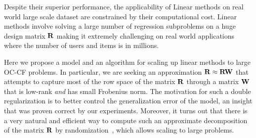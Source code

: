

Despite their superior performance, the applicability of Linear methods on real world large scale dataset are constrained by their computational cost. Linear methods involve solving  a large number of regression subproblems on a huge design matrix $\mathbf{R}$ making it extremely challenging on real world applications where the number of users and items is in millions.

Here we propose a model and an algorithm for scaling up linear methods to large OC-CF problems. 
In particular, we are seeking an approximation $\mathbf{R} \approx \mathbf{R} \mathbf{W}$ that attempts to capture most of the row space of the matrix $\mathbf{R}$ through a matrix $\mathbf{W}$ that is low-rank {\em and} has small Frobenius norm. The motivation for such a double regularization is to better control the generalization error of the model, an insight that was proven correct by our experiments. Moreover, it turns out that there is a very natural and efficient way to compute such an approximate decomposition of the matrix $\mathbf{R}$ by randomization~\citep{halko2011}, which allows scaling to large problems.

